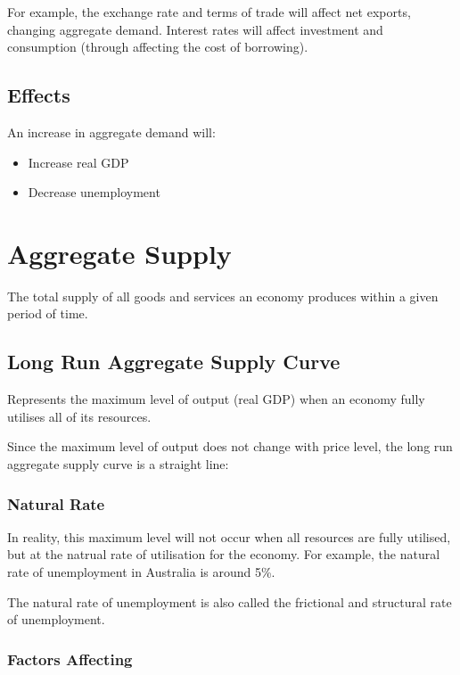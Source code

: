 \documentclass[a4paper,11pt]{article}
\begin{document}
For example, the exchange rate and terms of trade will affect net exports,
changing aggregate demand. Interest rates will affect investment and consumption
(through affecting the cost of borrowing).


\subsection{Effects}

An increase in aggregate demand will:

\begin{itemize}
\item Increase real GDP
\item Decrease unemployment
\end{itemize}




\section{Aggregate Supply}

The total supply of all goods and services an economy produces within a given
period of time.


\subsection{Long Run Aggregate Supply Curve}

Represents the maximum level of output (real GDP) when an economy fully utilises
all of its resources.

Since the maximum level of output does not change with price level, the long run
aggregate supply curve is a straight line:



\subsubsection{Natural Rate}

In reality, this maximum level will not occur when all resources are fully
utilised, but at the natrual rate of utilisation for the economy.  For example,
the natural rate of unemployment in Australia is around 5\%.

The natural rate of unemployment is also called the frictional and structural
rate of unemployment.


\subsubsection{Factors Affecting}
\end{document}
